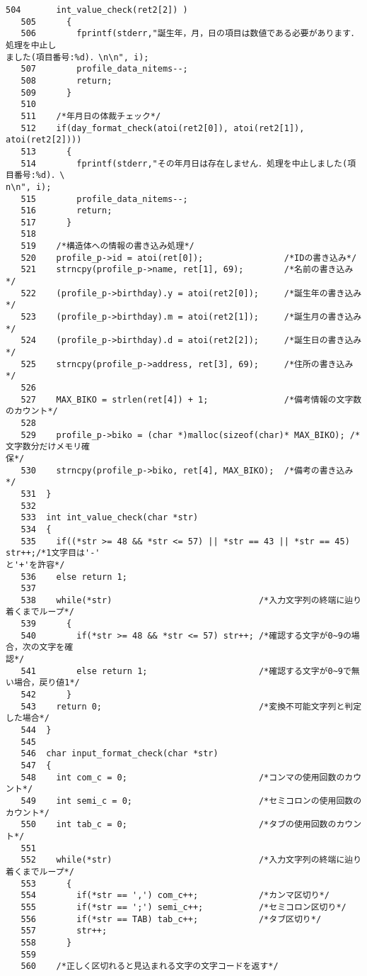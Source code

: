\begin{Verbatim}[fontsize=\small, baselinestretch=0.8]
   504	     int_value_check(ret2[2]) )
   505	    {
   506	      fprintf(stderr,"誕生年，月，日の項目は数値である必要があります．処理を中止し
ました(項目番号:%d)．\n\n", i);
   507	      profile_data_nitems--;
   508	      return;
   509	    }
   510	
   511	  /*年月日の体裁チェック*/
   512	  if(day_format_check(atoi(ret2[0]), atoi(ret2[1]), atoi(ret2[2])))
   513	    {
   514	      fprintf(stderr,"その年月日は存在しません．処理を中止しました(項目番号:%d)．\
n\n", i);
   515	      profile_data_nitems--;
   516	      return;
   517	    }
   518	
   519	  /*構造体への情報の書き込み処理*/
   520	  profile_p->id = atoi(ret[0]);                /*IDの書き込み*/
   521	  strncpy(profile_p->name, ret[1], 69);        /*名前の書き込み*/
   522	  (profile_p->birthday).y = atoi(ret2[0]);     /*誕生年の書き込み*/
   523	  (profile_p->birthday).m = atoi(ret2[1]);     /*誕生月の書き込み*/
   524	  (profile_p->birthday).d = atoi(ret2[2]);     /*誕生日の書き込み*/
   525	  strncpy(profile_p->address, ret[3], 69);     /*住所の書き込み*/
   526	
   527	  MAX_BIKO = strlen(ret[4]) + 1;               /*備考情報の文字数のカウント*/
   528	
   529	  profile_p->biko = (char *)malloc(sizeof(char)* MAX_BIKO); /*文字数分だけメモリ確
保*/
   530	  strncpy(profile_p->biko, ret[4], MAX_BIKO);  /*備考の書き込み*/
   531	}
   532	
   533	int int_value_check(char *str)
   534	{
   535	  if((*str >= 48 && *str <= 57) || *str == 43 || *str == 45) str++;/*1文字目は'-'
と'+'を許容*/
   536	  else return 1;
   537	
   538	  while(*str)                             /*入力文字列の終端に辿り着くまでループ*/
   539	    {
   540	      if(*str >= 48 && *str <= 57) str++; /*確認する文字が0~9の場合，次の文字を確
認*/
   541	      else return 1;                      /*確認する文字が0~9で無い場合，戻り値1*/
   542	    }
   543	  return 0;                               /*変換不可能文字列と判定した場合*/
   544	}
   545	
   546	char input_format_check(char *str)
   547	{
   548	  int com_c = 0;                          /*コンマの使用回数のカウント*/
   549	  int semi_c = 0;                         /*セミコロンの使用回数のカウント*/
   550	  int tab_c = 0;                          /*タブの使用回数のカウント*/
   551	
   552	  while(*str)                             /*入力文字列の終端に辿り着くまでループ*/
   553	    {
   554	      if(*str == ',') com_c++;            /*カンマ区切り*/
   555	      if(*str == ';') semi_c++;           /*セミコロン区切り*/
   556	      if(*str == TAB) tab_c++;            /*タブ区切り*/
   557	      str++;
   558	    }
   559	    
   560	  /*正しく区切れると見込まれる文字の文字コードを返す*/

\end{Verbatim}
